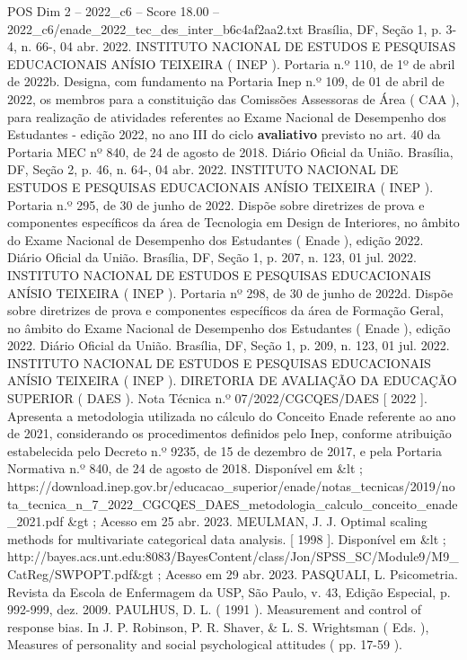 \begin{textsample}{POS Dim 2 – 2022\_c6 – Score 18.00 – 2022\_c6/enade\_2022\_tec\_des\_inter\_b6c4af2aa2.txt}
Brasília, DF, Seção 1, p. 3-4, n. 66-, 04 abr. 2022.
INSTITUTO NACIONAL DE ESTUDOS E PESQUISAS EDUCACIONAIS ANÍSIO TEIXEIRA ( INEP ).
Portaria n.º 110, de 1º de abril de 2022b.
Designa, com fundamento na Portaria Inep n.º 109, de 01 de abril de 2022, os membros para a constituição das Comissões Assessoras de Área ( CAA ), para realização de atividades referentes ao Exame Nacional de Desempenho dos Estudantes - edição 2022, no ano III do ciclo \textbf{avaliativo} previsto no art. 40 da Portaria MEC nº 840, de 24 de agosto de 2018.
Diário Oficial da União.
Brasília, DF, Seção 2, p. 46, n. 64-, 04 abr. 2022.
INSTITUTO NACIONAL DE ESTUDOS E PESQUISAS EDUCACIONAIS ANÍSIO TEIXEIRA ( INEP ).
Portaria n.º 295, de 30 de junho de 2022.
Dispõe sobre diretrizes de prova e componentes específicos da área de Tecnologia em Design de Interiores, no âmbito do Exame Nacional de Desempenho dos Estudantes ( Enade ), edição 2022.
Diário Oficial da União.
Brasília, DF, Seção 1, p. 207, n. 123, 01 jul. 2022.
INSTITUTO NACIONAL DE ESTUDOS E PESQUISAS EDUCACIONAIS ANÍSIO TEIXEIRA ( INEP ).
Portaria nº 298, de 30 de junho de 2022d.
Dispõe sobre diretrizes de prova e componentes específicos da área de Formação Geral, no âmbito do Exame Nacional de Desempenho dos Estudantes ( Enade ), edição 2022.
Diário Oficial da União.
Brasília, DF, Seção 1, p. 209, n. 123, 01 jul. 2022.
INSTITUTO NACIONAL DE ESTUDOS E PESQUISAS EDUCACIONAIS ANÍSIO TEIXEIRA ( INEP ).
DIRETORIA DE AVALIAÇÃO DA EDUCAÇÃO SUPERIOR ( DAES ).
Nota Técnica n.º 07/2022/CGCQES/DAES [ 2022 ].
Apresenta a metodologia utilizada no cálculo do Conceito Enade referente ao ano de 2021, considerando os procedimentos definidos pelo Inep, conforme atribuição estabelecida pelo Decreto n.º 9235, de 15 de dezembro de 2017, e pela Portaria Normativa n.º 840, de 24 de agosto de 2018.
Disponível em \&lt ; https://download.inep.gov.br/educacao\_superior/enade/notas\_tecnicas/2019/nota\_tecnica\_n\_7\_2022\_CGCQES\_DAES\_metodologia\_calculo\_conceito\_enade\_2021.pdf \&gt ; Acesso em 25 abr. 2023.
MEULMAN, J.
J.
Optimal scaling methods for multivariate categorical data analysis. [ 1998 ].
Disponível em \&lt ; http://bayes.acs.unt.edu:8083/BayesContent/class/Jon/SPSS\_SC/Module9/M9\_CatReg/SWPOPT.pdf\&gt ; Acesso em 29 abr. 2023.
PASQUALI, L.
Psicometria.
Revista da Escola de Enfermagem da USP, São Paulo, v. 43, Edição Especial, p. 992-999, dez. 2009.
PAULHUS, D.
L. ( 1991 ).
Measurement and control of response bias.
In J.
P.
Robinson, P.
R.
Shaver, \& L.
S.
Wrightsman ( Eds. ), Measures of personality and social psychological attitudes ( pp. 17-59 ).

\end{textsample}
